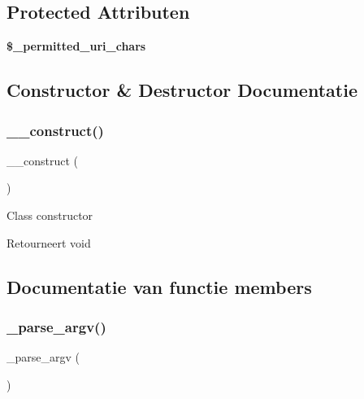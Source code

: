 \subsection*{Protected Attributen}
\begin{DoxyCompactItemize}
\item 
\mbox{\label{class_c_i___u_r_i_a5f6c67e88b35c1006295f41bc878f8b7}} 
{\bfseries \$\+\_\+permitted\+\_\+uri\+\_\+chars}
\end{DoxyCompactItemize}


\subsection{Constructor \& Destructor Documentatie}
\mbox{\label{class_c_i___u_r_i_a095c5d389db211932136b53f25f39685}} 
\subsubsection{\texorpdfstring{\_\_construct()}{\_\_construct()}}
{\footnotesize\ttfamily \+\_\+\+\_\+construct (\begin{DoxyParamCaption}{ }\end{DoxyParamCaption})}

Class constructor

\begin{DoxyReturn}{Retourneert}
void 
\end{DoxyReturn}


\subsection{Documentatie van functie members}
\mbox{\label{class_c_i___u_r_i_a336e05909197d401613263ebdab6550c}} 
\subsubsection{\texorpdfstring{\_parse\_argv()}{\_parse\_argv()}}
{\footnotesize\ttfamily \+\_\+parse\+\_\+argv (\begin{DoxyParamCaption}{ }\end{DoxyParamCaption})\hspace{0.3cm}{\ttfamily [protected]}}

